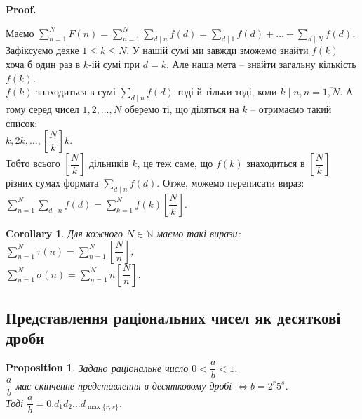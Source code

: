 \documentclass[a4paper, 10pt]{article}
\makeatletter
\theoremstyle{theoremdd}
\theoremstyle{theoremdd}
\theoremstyle{theoremdd}
\theoremstyle{theoremdd}
\theoremstyle{theoremdd}
\newtheorem{proposition}[theorem]{Proposition}
\theoremstyle{theoremdd}
\theoremstyle{theoremdd}
\theoremstyle{theoremdd}
\newtheorem{corollary}[theorem]{Corollary}
\renewenvironment{proof}[1][Proof.\\]{\par
\pushQED{\hfill \qed}%
\normalfont \topsep6\p@\@plus6\p@\relax
\trivlist
\item\relax
{\bfseries
#1\@addpunct{.}}\hspace\labelsep\ignorespaces
}{%
\popQED\endtrivlist\@endpefalse
}
\makeatother
\begin{document}
\begin{proof}
Маємо $\displaystyle\sum_{n=1}^N F(n) = \sum_{n=1}^N \sum_{d \mid n} f(d) = \sum_{d \mid 1} f(d) + \dots + \sum_{d \mid N}f(d)$.\\
Зафіксуємо деяке $1 \leq k \leq N$. У нашій сумі ми завжди зможемо знайти $f(k)$ хоча б один раз в $k$-ій сумі при $d = k$. Але наша мета -- знайти загальну кількість $f(k)$.\\
$f(k)$ знаходиться в сумі $\displaystyle\sum_{d \mid n} f(d)$ тоді й тільки тоді, коли $k \mid n, n = \overline{1,N}$. А тому серед чисел $1,2,\dots,N$ оберемо ті, що діляться на $k$ -- отримаємо такий список:\\
$k,2k,\dots,\left[ \dfrac{N}{k} \right]k$.\\
Тобто всього $\left[ \dfrac{N}{k} \right]$ дільників $k$, це теж саме, що $f(k)$ знаходиться в $\left[ \dfrac{N}{k} \right]$ різних сумах формата $\displaystyle\sum_{d \mid n} f(d)$. Отже, можемо переписати вираз:\\
$\displaystyle\sum_{n=1}^N \sum_{d \mid n}f(d) = \sum_{k=1}^N f(k) \left[ \dfrac{N}{k} \right]$.
\end{proof}

\begin{corollary}
Для кожного $N \in \mathbb{N}$ маємо такі вирази:\\
$\displaystyle\sum_{n=1}^N \tau(n) = \sum_{n=1}^N \left[ \dfrac{N}{n} \right]$;\\
$\displaystyle\sum_{n=1}^N \sigma(n) = \sum_{n=1}^N n \left[ \dfrac{N}{n} \right]$.
\end{corollary}

\iffalse
\subsection{Представлення раціональних чисел як десяткові дроби}

\begin{proposition}
Задано раціональне число $0 < \dfrac{a}{b} < 1$.\\
$\dfrac{a}{b}$ має скінченне представлення в десятковому дробі $\iff b = 2^r 5^s$.\\
Тоді $\dfrac{a}{b} = 0.d_1d_2\dots d_{\max\{r,s\}}$.
\end{proposition}
\end{document}
